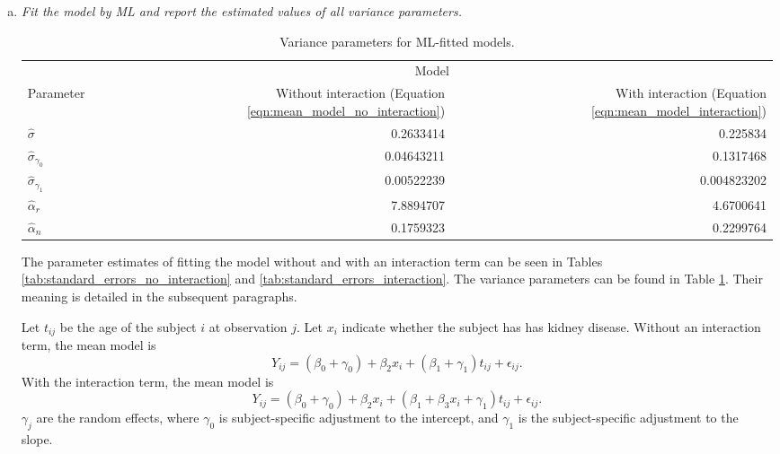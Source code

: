 \documentclass[11pt, letterpaper]{article}
\begin{document}
\begin{enumerate}[(a)]
\item {\em Fit the model by ML and
report the
estimated values of all variance parameters. }

\begin{table}
  \centering
  \begin{tabular}{lrr}
    \toprule
    & \multicolumn{2}{c}{Model} \\
    Parameter & Without interaction (Equation \ref{eqn:mean_model_no_interaction}) & With interaction (Equation \ref{eqn:mean_model_interaction}) \\
    \midrule
    $\hat{\sigma}$ & 0.2633414 & 0.225834 \\
    $\hat{\sigma}_{\gamma_0}$ & 0.04643211 & 0.1317468 \\
    $\hat{\sigma}_{\gamma_1}$ & 0.00522239 & 0.004823202 \\
    $\hat{\alpha}_r$ & 7.8894707 & 4.6700641 \\
    $\hat{\alpha}_n$ & 0.1759323  & 0.2299764 \\
    \bottomrule
  \end{tabular}
  \caption{Variance parameters for ML-fitted models.}
  \label{tab:variance_parameters}
\end{table}

\begin{description}
  The parameter estimates of fitting the model without and with an interaction
  term can be seen in Tables \ref{tab:standard_errors_no_interaction} and
  \ref{tab:standard_errors_interaction}. The variance parameters can be found in
  Table \ref{tab:variance_parameters}. Their meaning is detailed in the
  subsequent paragraphs.

  Let $t_{ij}$ be the age of the subject $i$ at observation $j$. Let $x_i$
  indicate whether the subject has has kidney disease. Without an interaction
  term, the mean model is
  \begin{equation}
    Y_{ij} = \left(\beta_0 + \gamma_0\right) +
    \beta_2x_i +
    \left(\beta_1 + \gamma_1\right)t_{ij} + \epsilon_{ij}.
    \label{eqn:mean_model_no_interaction}
  \end{equation}
  With the interaction term, the mean model is
  \begin{equation}
    Y_{ij} = \left(\beta_0 + \gamma_0\right) +
    \beta_2x_i +
    \left(\beta_1 + \beta_3x_i +\gamma_1\right)t_{ij} + \epsilon_{ij}.
    \label{eqn:mean_model_interaction}
  \end{equation}
  $\gamma_j$ are the random effects, where $\gamma_0$ is subject-specific
  adjustment to the intercept, and $\gamma_1$ is the subject-specific adjustment
  to the slope.
  

\end{description}
\end{enumerate}
\end{document}

